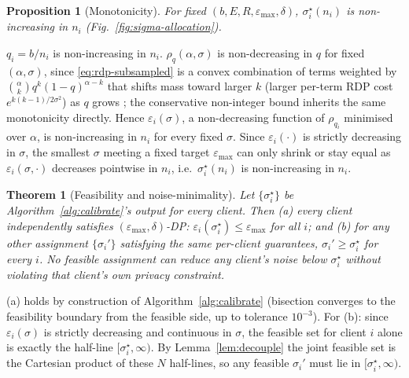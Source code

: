 \documentclass[journal]{IEEEtran}
\newtheorem{proposition}{Proposition}
\newtheorem{theorem}{Theorem}
\begin{document}
\begin{proposition}[Monotonicity]
\label{prop:monotone}
For fixed $(b,E,R,\varepsilon_{\max},\delta)$, $\sigma_i^\star(n_i)$ is
non-increasing in $n_i$ (Fig.~\ref{fig:sigma-allocation}).
\end{proposition}
\begin{IEEEproof}
$q_i=b/n_i$ is non-increasing in $n_i$. $\rho_q(\alpha,\sigma)$ is
non-decreasing in $q$ for fixed $(\alpha,\sigma)$, since
\eqref{eq:rdp-subsampled} is a convex combination of terms weighted by
$\binom{\alpha}{k}q^k(1-q)^{\alpha-k}$ that shifts mass toward larger
$k$ (larger per-term RDP cost $e^{k(k-1)/2\sigma^2}$) as $q$ grows
\cite{wang2019}; the conservative non-integer bound inherits the same
monotonicity directly. Hence $\varepsilon_i(\sigma)$, a non-decreasing
function of $\rho_{q_i}$ minimised over $\alpha$, is non-increasing in
$n_i$ for every fixed $\sigma$. Since $\varepsilon_i(\cdot)$ is
strictly decreasing in $\sigma$, the smallest $\sigma$ meeting a fixed
target $\varepsilon_{\max}$ can only shrink or stay equal as
$\varepsilon_i(\sigma,\cdot)$ decreases pointwise in $n_i$, i.e.\
$\sigma_i^\star(n_i)$ is non-increasing in $n_i$.
\end{IEEEproof}

\begin{theorem}[Feasibility and noise-minimality]
\label{thm:main}
Let $\{\sigma_i^\star\}$ be Algorithm~\ref{alg:calibrate}'s output for
every client. Then (a) every client independently satisfies
$(\varepsilon_{\max},\delta)$-DP: $\varepsilon_i(\sigma_i^\star)\le
\varepsilon_{\max}$ for all $i$; and (b) for any other assignment
$\{\sigma_i'\}$ satisfying the same per-client guarantees,
$\sigma_i' \ge \sigma_i^\star$ for every $i$. No feasible assignment
can reduce any client's noise below $\sigma_i^\star$ without violating
that client's own privacy constraint.
\end{theorem}
\begin{IEEEproof}
(a) holds by construction of Algorithm~\ref{alg:calibrate} (bisection
converges to the feasibility boundary from the feasible side, up to
tolerance $10^{-3}$). For (b): since $\varepsilon_i(\sigma)$ is
strictly decreasing and continuous in $\sigma$, the feasible set for
client $i$ alone is exactly the half-line $[\sigma_i^\star,\infty)$.
By Lemma~\ref{lem:decouple} the joint feasible set is the Cartesian
product of these $N$ half-lines, so any feasible $\sigma_i'$ must lie
in $[\sigma_i^\star,\infty)$.
\end{IEEEproof}
\end{document}
